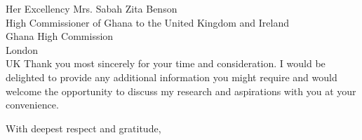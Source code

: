 \documentclass[12pt,a4paper]{letter}
\begin{document}
\begin{letter}{Her Excellency Mrs. Sabah Zita Benson\\High Commissioner of Ghana to the United Kingdom and Ireland\\Ghana High Commission\\London\\UK}
Thank you most sincerely for your time and consideration. I would be delighted to provide any additional information you might require and would welcome the opportunity to discuss my research and aspirations with you at your convenience.

\closing{With deepest respect and gratitude,}

\signature{Deborah Akuoko}


\end{letter}
\end{document}
